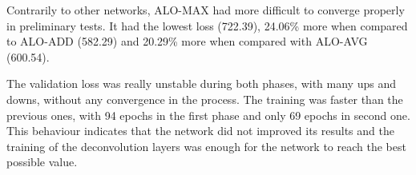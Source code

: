Contrarily to other networks, ALO-MAX had more difficult to converge properly in preliminary tests.
It had the lowest loss (722.39), 24.06\% more when compared to ALO-ADD (582.29) and 20.29\% more when compared with ALO-AVG (600.54).



The validation loss was really unstable during both phases, with many ups and downs, without any convergence in the process.
The training was faster than the previous ones, with 94 epochs in the first phase and only 69 epochs in second one.
This behaviour indicates that the network did not improved its results and the training of the deconvolution layers was enough for the network to reach the best possible value.


